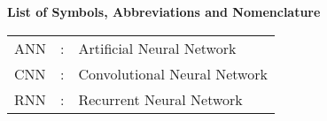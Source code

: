 
\thispagestyle{plain}
\begin{center}
	{\Large \bf List of Symbols, Abbreviations and Nomenclature }
\end{center}

\begin{longtable}{L{.1\linewidth}cL{.7\linewidth}}
	ANN & : &Artificial Neural Network \\
	CNN & : &Convolutional Neural Network \\
	RNN & : &Recurrent Neural Network \\
\end{longtable}